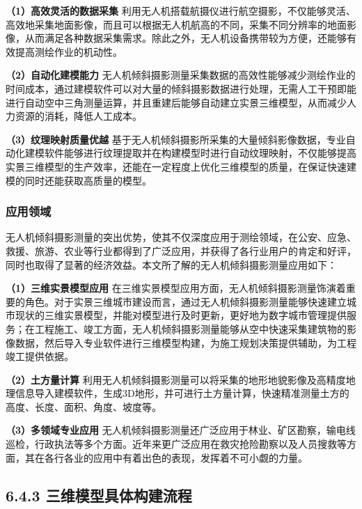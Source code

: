 \textbf{（1）高效灵活的数据采集}
利用无人机搭载航摄仪进行航空摄影，不仅能够灵活、高效地采集地面影像，而且可以根据无人机航高的不同，采集不同分辨率的地面影像，从而满足各种数据采集需求。除此之外，无人机设备携带较为方便，还能够有效提高测绘作业的机动性。

\textbf{（2）自动化建模能力}
无人机倾斜摄影测量采集数据的高效性能够减少测绘作业的时间成本，通过建模软件可以对大量的倾斜摄影数据进行处理，无需人工干预即能进行自动空中三角测量运算，并且重建后能够自动建立实景三维模型，从而减少人力资源的消耗，降低人工成本。

\textbf{（3）纹理映射质量优越}
基于无人机倾斜摄影所采集的大量倾斜影像数据，专业自动化建模软件能够进行纹理提取并在构建模型时进行自动纹理映射，不仅能够提高实景三维模型的生产效率，还能在一定程度上优化三维模型的质量，在保证快速建模的同时还能获取高质量的模型。

\subsubsection{应用领域}\label{ux5e94ux7528ux9886ux57df}

无人机倾斜摄影测量的突出优势，使其不仅深度应用于测绘领域，在公安、应急、救援、旅游、农业等行业都得到了广泛应用，并获得了各行业用户的肯定和好评，同时也取得了显著的经济效益。本文所了解的无人机倾斜摄影测量应用如下：

\textbf{（1）三维实景模型应用}
在三维实景模型应用方面，无人机倾斜摄影测量饰演着重要的角色。对于实景三维城市建设而言，通过无人机倾斜摄影测量能够快速建立城市现状的三维实景模型，并能对模型进行及时更新，更好地为数字城市管理提供服务；在工程施工、竣工方面，无人机倾斜摄影测量能够从空中快速采集建筑物的影像数据，然后导入专业软件进行三维模型构建，为施工规划决策提供辅助，为工程竣工提供依据。

\textbf{（2）土方量计算}
利用无人机倾斜摄影测量可以将采集的地形地貌影像及高精度地理信息导入建模软件，生成3D地形，并可进行土方量计算，快速精准测量土方的高度、长度、面积、角度、坡度等。

\textbf{（3）多领域专业应用}
无人机倾斜摄影测量还广泛应用于林业、矿区勘察，输电线巡检，行政执法等多个方面。近年来更广泛应用在救灾抢险勘察以及人员搜救等方面，其在各行各业的应用中有着出色的表现，发挥着不可小觑的力量。

\subsection{6.4.3
三维模型具体构建流程}\label{ux4e09ux7ef4ux6a21ux578bux5177ux4f53ux6784ux5efaux6d41ux7a0b}

